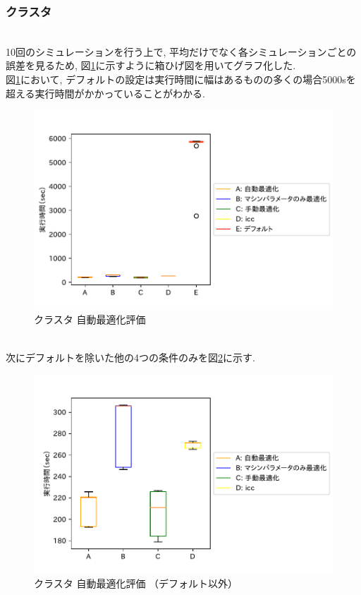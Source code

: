 \subsubsection{クラスタ}~\\
10回のシミュレーションを行う上で, 平均だけでなく各シミュレーションごとの誤差を見るため,
図\ref{fig:cluster-compare}に示すように箱ひげ図を用いてグラフ化した.\\
図\ref{fig:cluster-compare}において, デフォルトの設定は実行時間に幅はあるものの多くの場合5000sを超える実行時間がかかっていることがわかる.\\
\begin{figure}[htb]
 \begin{center}
    \includegraphics[width=14cm]{./images/cluster-compare.pdf}
    \caption{クラスタ 自動最適化評価}
    \label{fig:cluster-compare}
  \end{center}
\end{figure}~\\
次にデフォルトを除いた他の4つの条件のみを図\ref{fig:cluster-compare-2}に示す.\\
\begin{figure}[htb]
 \begin{center}
    \includegraphics[width=14cm]{./images/cluster-compare-2.pdf}
    \caption{クラスタ 自動最適化評価 （デフォルト以外）}
    \label{fig:cluster-compare-2}
  \end{center}
\end{figure}~\\
